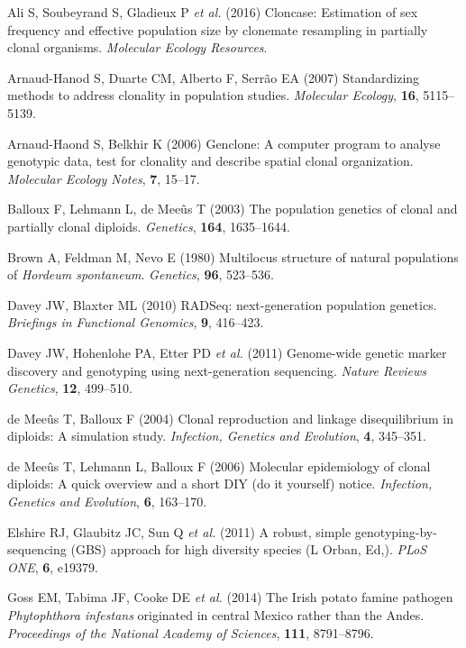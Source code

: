 \documentclass[]{article}
\theoremstyle{definition}
\theoremstyle{definition}
\theoremstyle{remark}
\begin{document}
\hypertarget{ref-ali2016cloncase}{}
Ali S, Soubeyrand S, Gladieux P \emph{et al.} (2016) Cloncase:
Estimation of sex frequency and effective population size by clonemate
resampling in partially clonal organisms. \emph{Molecular Ecology
Resources}.

\hypertarget{ref-arnaud2007standardizing}{}
Arnaud-Hanod S, Duarte CM, Alberto F, Serrão EA (2007) Standardizing
methods to address clonality in population studies. \emph{Molecular
Ecology}, \textbf{16}, 5115--5139.

\hypertarget{ref-arnaud2006genclone}{}
Arnaud-Haond S, Belkhir K (2006) Genclone: A computer program to analyse
genotypic data, test for clonality and describe spatial clonal
organization. \emph{Molecular Ecology Notes}, \textbf{7}, 15--17.

\hypertarget{ref-balloux2003population}{}
Balloux F, Lehmann L, de Meeûs T (2003) The population genetics of
clonal and partially clonal diploids. \emph{Genetics}, \textbf{164},
1635--1644.

\hypertarget{ref-brown1980multilocus}{}
Brown A, Feldman M, Nevo E (1980) Multilocus structure of natural
populations of \emph{Hordeum spontaneum}. \emph{Genetics}, \textbf{96},
523--536.

\hypertarget{ref-davey2010rad}{}
Davey JW, Blaxter ML (2010) RADSeq: next-generation population genetics.
\emph{Briefings in Functional Genomics}, \textbf{9}, 416--423.

\hypertarget{ref-davey2011genome}{}
Davey JW, Hohenlohe PA, Etter PD \emph{et al.} (2011) Genome-wide
genetic marker discovery and genotyping using next-generation
sequencing. \emph{Nature Reviews Genetics}, \textbf{12}, 499--510.

\hypertarget{ref-de2004clonal}{}
de Meeûs T, Balloux F (2004) Clonal reproduction and linkage
disequilibrium in diploids: A simulation study. \emph{Infection,
Genetics and Evolution}, \textbf{4}, 345--351.

\hypertarget{ref-de2006molecular}{}
de Meeûs T, Lehmann L, Balloux F (2006) Molecular epidemiology of clonal
diploids: A quick overview and a short DIY (do it yourself) notice.
\emph{Infection, Genetics and Evolution}, \textbf{6}, 163--170.

\hypertarget{ref-elshire2011robust}{}
Elshire RJ, Glaubitz JC, Sun Q \emph{et al.} (2011) A robust, simple
genotyping-by-sequencing (GBS) approach for high diversity species (L
Orban, Ed,). \emph{PLoS ONE}, \textbf{6}, e19379.

\hypertarget{ref-goss2014irish}{}
Goss EM, Tabima JF, Cooke DE \emph{et al.} (2014) The Irish potato
famine pathogen \emph{Phytophthora infestans} originated in central
Mexico rather than the Andes. \emph{Proceedings of the National Academy
of Sciences}, \textbf{111}, 8791--8796.
\end{document}
